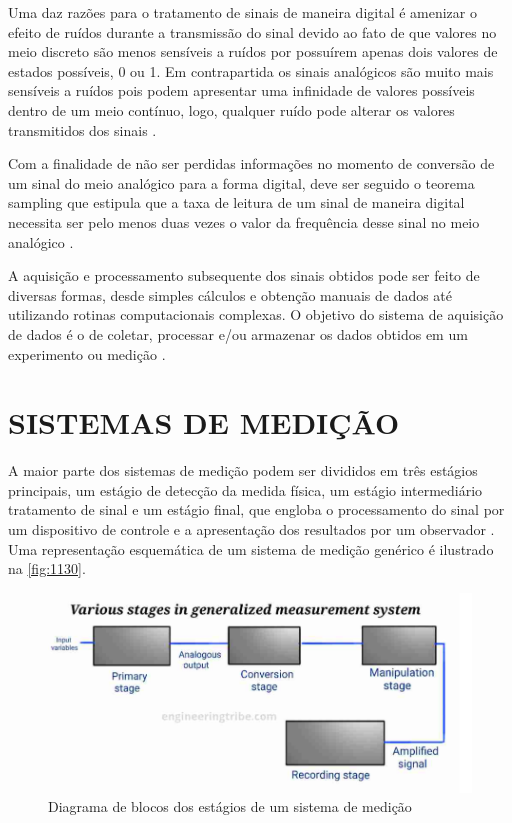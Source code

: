 Uma daz razões para o tratamento de sinais de maneira digital é amenizar o efeito de ruídos durante a transmissão do sinal devido ao fato de que valores no meio discreto
são menos sensíveis a ruídos por possuírem apenas dois valores de estados possíveis, 0 ou 1.
Em contrapartida os sinais analógicos são muito mais sensíveis a ruídos pois podem apresentar uma infinidade de valores possíveis dentro de um meio contínuo,
logo, qualquer ruído pode alterar os valores transmitidos dos sinais \autocite{Hollman2011}.

Com a finalidade de não ser perdidas informações no momento de conversão de um sinal do meio analógico para a forma digital, deve ser seguido o teorema sampling que estipula
que a taxa de leitura de um sinal de maneira digital necessita ser pelo menos duas vezes o valor da frequência desse sinal no meio analógico \autocite{Hollman2011}.

A aquisição e processamento subsequente dos sinais obtidos pode ser feito de diversas formas, desde simples cálculos e obtenção manuais de dados até utilizando
rotinas computacionais complexas. O objetivo do sistema de aquisição de dados é o de coletar, processar e/ou armazenar os dados obtidos em um experimento ou medição
\autocite{Hollman2011}.

\section{SISTEMAS DE MEDIÇÃO}

A maior parte dos sistemas de medição podem ser divididos em três estágios principais, um estágio de detecção da medida física, um estágio intermediário tratamento de sinal e um estágio final,
que engloba o processamento do sinal por um dispositivo de controle e a apresentação dos resultados por um observador \autocite{Hollman2011}.
Uma representação esquemática de um sistema de medição genérico é ilustrado na \autoref{fig:1130}.

\begin{figure}[htb]
	\caption{\label{fig:1130} Diagrama de blocos dos estágios de um sistema de medição}
	\begin{center}
		\includegraphics[width=\textwidth]{pictures/1130.png}
	\end{center}
\end{figure}

